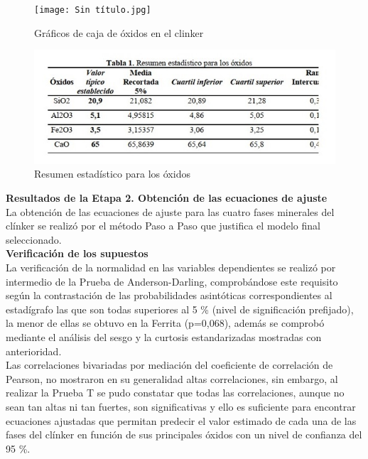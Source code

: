 \documentclass[spanish]{report}
\begin{document}
\begin{figure}[h]
    \centering
    \texttt{[image: Sin título.jpg]}
    \caption{Gráficos de caja de óxidos en el clinker}
    \label{fig:enter-label}
\end{figure}

\begin{figure}[h]
    \centering
    \includegraphics[width=1\linewidth]{Fig.jpg}
    \caption{Resumen estadístico para los óxidos}
    \label{fig:enter-label}
\end{figure}

\textbf{Resultados de la Etapa 2. Obtención de las ecuaciones de ajuste}\\

La obtención de las ecuaciones de ajuste para las cuatro fases minerales del clínker se realizó por el método Paso a Paso que justifica el modelo final seleccionado. \\

\textbf{Verificación de los supuestos}\\

La verificación de la normalidad en las variables dependientes se realizó por intermedio de la Prueba de Anderson-Darling, comprobándose este requisito según la contrastación de las probabilidades asintóticas correspondientes al estadígrafo las que son todas superiores al 5 \% (nivel de significación prefijado), la menor de ellas se obtuvo en la Ferrita (p=0,068), además se comprobó mediante el análisis del sesgo y la curtosis estandarizadas mostradas con anterioridad.\\

Las correlaciones bivariadas por mediación del coeficiente de correlación de Pearson, no mostraron en su generalidad altas correlaciones, sin embargo, al realizar la Prueba T se pudo constatar que todas las correlaciones, aunque no sean tan altas ni tan fuertes, son significativas y ello es suficiente para encontrar ecuaciones ajustadas que permitan predecir el valor estimado de cada una de las fases del clínker en función de sus principales óxidos con un nivel de confianza del 95 \%.\\
\end{document}
